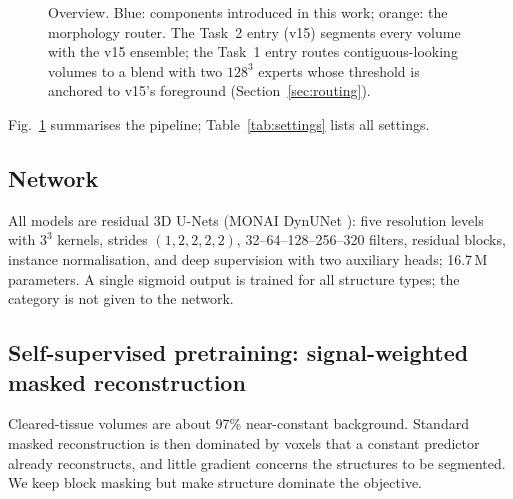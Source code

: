 \documentclass[11pt,a4paper]{article}
\begin{document}
\begin{figure}[!htbp]
{}
\caption{Overview. Blue: components introduced in this work; orange: the morphology router. The Task~2 entry (v15) segments every volume with the v15 ensemble; the Task~1 entry routes contiguous-looking volumes to a blend with two $128^3$ experts whose threshold is anchored to v15's foreground (Section~\ref{sec:routing}).}
\label{fig:overview}
\end{figure}

Fig.~\ref{fig:overview} summarises the pipeline; Table~\ref{tab:settings} lists all settings.

\subsection{Network}
All models are residual 3D U-Nets (MONAI DynUNet \cite{cardoso2022monai}): five resolution levels with $3^3$ kernels, strides $(1,2,2,2,2)$, 32--64--128--256--320 filters, residual blocks, instance normalisation, and deep supervision with two auxiliary heads; 16.7\,M parameters. A single sigmoid output is trained for all structure types; the category is not given to the network.

\subsection{Self-supervised pretraining: signal-weighted masked reconstruction}
\label{sec:ssl}
Cleared-tissue volumes are about 97\% near-constant background. Standard masked reconstruction is then dominated by voxels that a constant predictor already reconstructs, and little gradient concerns the structures to be segmented. We keep block masking but make structure dominate the objective.
\end{document}
